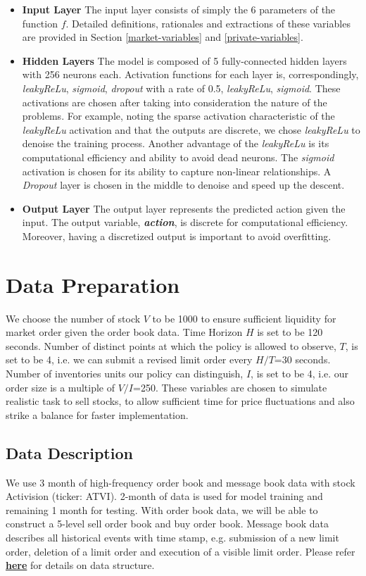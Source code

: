 \documentclass[12pt]{extarticle}
\begin{document}
\begin{itemize}
\item \textbf{Input Layer} The input layer consists of simply the 6 parameters of the function $f$.
Detailed definitions, rationales and extractions of these variables are
provided in Section \ref{market-variables} and \ref{private-variables}.

\item \textbf{Hidden Layers} The model is composed of 5 fully-connected hidden layers with
256 neurons each. Activation functions for each layer is, correspondingly,
\textit{leakyReLu},
\textit{sigmoid}, \textit{dropout} with a rate of 0.5,
\textit{leakyReLu}, \textit{sigmoid}. These activations are
chosen after taking into consideration the nature of the
problems. For example, noting the sparse activation characteristic of
the \textit{leakyReLu} activation and that the outputs are discrete, we chose \textit{leakyReLu}
to denoise the training process. Another advantage of the \textit{leakyReLu}
is its computational efficiency and ability to avoid dead neurons.
The \textit{sigmoid} activation is chosen for its ability to capture
non-linear relationships. A \textit{Dropout} layer is chosen
in the middle to denoise and speed up the descent.

\item \textbf{Output Layer} The output layer represents the predicted action given
the input. The output variable, \textit{\textbf{action}}, is discrete for computational
efficiency. Moreover, having a discretized output is important to avoid overfitting.

\end{itemize}


\section{Data Preparation}
We choose the number of stock $V$ to be 1000 to ensure sufficient liquidity for market order given the order book data.
Time Horizon $H$ is set to be 120 seconds. Number of distinct points at which the policy is allowed to observe, $T$, is set to be 4, i.e. we can submit a revised limit order every $H/T$=30 seconds. Number of inventories units our policy can distinguish, $I$, is set to be 4, i.e. our order size is a multiple of $V/I$=250. These variables are chosen to simulate realistic task to sell stocks, to allow sufficient time for price fluctuations and also strike a balance for faster implementation.

\subsection{Data Description}
We use 3 month of high-frequency order book and message book data with stock Activision (ticker: ATVI). 2-month of data is used for model training and remaining 1 month for testing.
With order book data, we will be able to construct a 5-level sell order book and buy order book.
Message book data describes all historical events with time stamp, e.g. submission of a new limit order, deletion of a limit order and execution of a visible limit order. Please refer \href{https://lobsterdata.com/info/DataStructure.php}{\textbf{here}}
for details on data structure.
\end{document}

